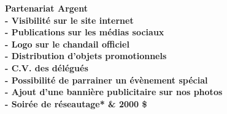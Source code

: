 \bf Partenariat Argent\\
- Visibilité sur le site internet\\
- Publications sur les médias sociaux\\
- Logo sur le chandail officiel\\
- Distribution d'objets promotionnels\\
- C.V. des délégués\\
- Possibilité de parrainer un évènement spécial\\
- Ajout d'une bannière publicitaire sur nos photos\\
- Soirée de réseautage*
& 2000 \$\\
